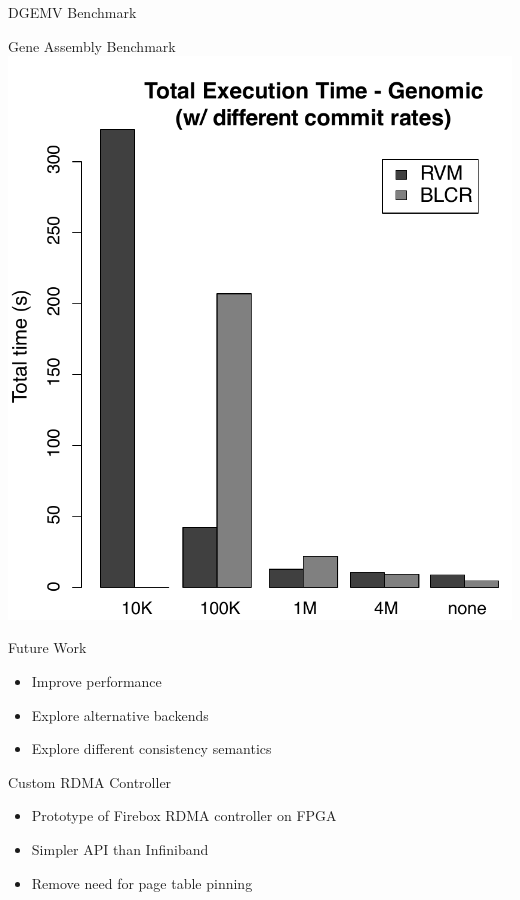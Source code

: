 \documentclass{beamer}
\begin{document}
\begin{frame}{DGEMV Benchmark}
\end{frame}

\begin{frame}{Gene Assembly Benchmark}
    \centering
    \includegraphics[scale=0.25]{genome_total_time_commit.pdf}
\end{frame}

\begin{frame}{Future Work}
    \begin{itemize}
        \item Improve performance
        \item Explore alternative backends
        \item Explore different consistency semantics
    \end{itemize}
\end{frame}

\begin{frame}{Custom RDMA Controller}
    \begin{itemize}
        \item Prototype of Firebox RDMA controller on FPGA
        \item Simpler API than Infiniband
        \item Remove need for page table pinning
    \end{itemize}
\end{frame}
\end{document}
